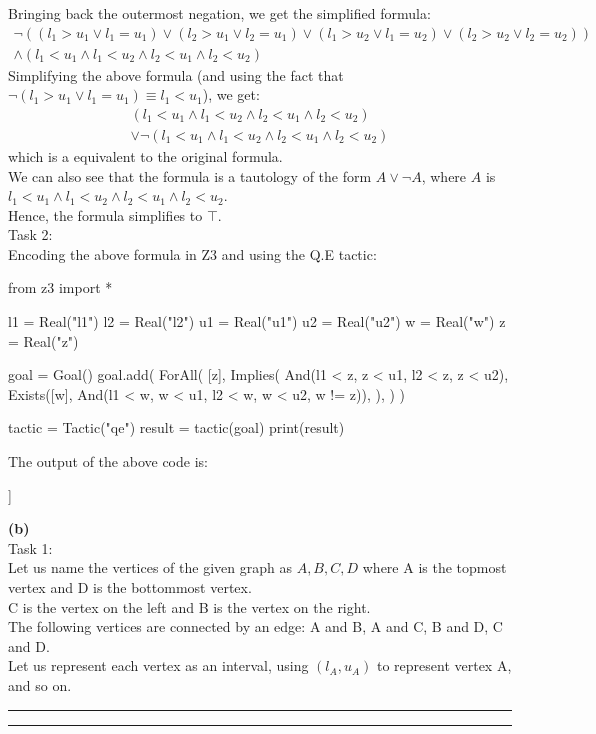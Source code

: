 \documentclass[12pt,letterpaper, onecolumn]{exam}
\begin{document}
\begin{questions}
	Bringing back the outermost negation, we get the simplified formula:
	\begin{align*}
		\neg 
		((l_1 > u_1 \lor l_1 = u_1) \lor (l_2 > u_1 \lor l_2 = u_1) \lor (l_1 > u_2 \lor l_1 = u_2) \lor (l_2 > u_2 \lor l_2 = u_2)) \\
		\land (l_1 < u_1 \land l_1 < u_2 \land l_2 < u_1 \land l_2 < u_2)
	\end{align*}
	Simplifying the above formula (and using the fact that $ \neg (l_1 > u_1 \lor l_1 = u_1) \equiv l_1 < u_1 $), we get:
	\begin{align*}
		(l_1 < u_1 \land l_1 < u_2 \land l_2 < u_1 \land l_2 < u_2) \\
		\lor \neg (l_1 < u_1 \land l_1 < u_2 \land l_2 < u_1 \land l_2 < u_2)
	\end{align*}
	which is a equivalent to the original formula. \\	
	We can also see that the formula is a tautology of the form $ A \lor \neg A $, where $ A $ is $ l_1 < u_1 \land l_1 < u_2 \land l_2 < u_1 \land l_2 < u_2 $. \\
	Hence, the formula simplifies to $ \top $. \\

	Task 2: \\
	Encoding the above formula in Z3 and using the Q.E tactic:
	\begin{python}
		from z3 import *

l1 = Real("l1")
l2 = Real("l2")
u1 = Real("u1")
u2 = Real("u2")
w = Real("w")
z = Real("z")

goal = Goal()
goal.add(
    ForAll(
        [z],
        Implies(
            And(l1 < z, z < u1, l2 < z, z < u2),
            Exists([w], And(l1 < w, w < u1, l2 < w, w < u2, w != z)),
        ),
    )
)

tactic = Tactic("qe")
result = tactic(goal)
print(result)
	\end{python}
	The output of the above code is:
	\begin{python}
[[]]
	\end{python}

	\textbf{(b)} \\
	Task 1: \\
	Let us name the vertices of the given graph as $ A, B, C, D $ where A is the topmost vertex and D is the bottommost vertex. \\
	C is the vertex on the left and B is the vertex on the right. \\
	The following vertices are connected by an edge: A and B, A and C, B and D, C and D. \\
	Let us represent each vertex as an interval, using $ (l_{A}, u_{A}) $ to represent vertex A, and so on. \\ 
	
    {\rule{17cm}{0.4pt}}
	\question[]
	\solutiontitle


    {\rule{17cm}{0.4pt}}

\end{questions}
\end{document}
